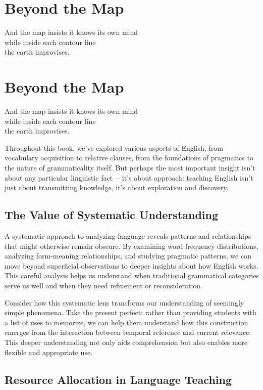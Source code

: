 \chapter{Beyond the Map}

\epigraph{And the map insists it knows its own mind\\
while inside each contour line\\
the earth improvises.}{}


\chapter{Beyond the Map}

\epigraph{And the map insists it knows its own mind\\
while inside each contour line\\
the earth improvises.}{}

Throughout this book, we've explored various aspects of English, from vocabulary acquisition to relative clauses, from the foundations of pragmatics to the nature of grammaticality itself. But perhaps the most important insight isn't about any particular linguistic fact~-- it's about approach: teaching English isn't just about transmitting knowledge, it's about exploration and discovery.

\section*{The Value of Systematic Understanding}

A systematic approach to analyzing language reveals patterns and relationships that might otherwise remain obscure. By examining word frequency distributions, analyzing form-meaning relationships, and studying pragmatic patterns, we can move beyond superficial observations to deeper insights about how English works. This careful analysis helps us understand when traditional grammatical categories serve us well and when they need refinement or reconsideration.

Consider how this systematic lens transforms our understanding of seemingly simple phenomena. Take the present perfect: rather than providing students with a list of uses to memorize, we can help them understand how this construction emerges from the interaction between temporal reference and current relevance. This deeper understanding not only aids comprehension but also enables more flexible and appropriate use.

\section*{Resource Allocation in Language Teaching}

